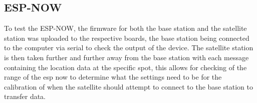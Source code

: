 \subsection{ESP-NOW}
To test the ESP-NOW, the firmware for both the base station and the satellite station was uploaded to the respective boards, the base station being connected to the computer via serial to check the output of the device. The satellite station is then taken further and further away from the base station with each message containing the location data at the specific spot, this allows for checking of the range of the esp now to determine what the settings need to be for the calibration of when the satellite should attempt to connect to the base station to transfer data.






